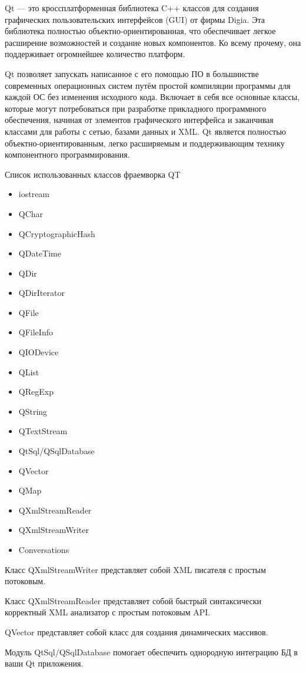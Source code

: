 Qt --- это кроссплатформенная библиотека C++ классов для создания графических пользовательских интерфейсов (GUI) от фирмы Digia. Эта библиотека полностью объектно-ориентированная, что обеспечивает легкое расширение возможностей и создание новых компонентов. Ко всему прочему, она поддерживает огромнейшее количество платформ.

Qt позволяет запускать написанное с его помощью ПО в большинстве современных операционных систем путём простой компиляции программы для каждой ОС без изменения исходного кода. Включает в себя все основные классы, которые могут потребоваться при разработке прикладного программного обеспечения, начиная от элементов графического интерфейса и заканчивая классами для работы с сетью, базами данных и XML. Qt является полностью объектно-ориентированным, легко расширяемым и поддерживающим технику компонентного программирования.

Список использованных классов фраемворка QT
\begin{itemize}
\item iostream
\item QChar
\item QCryptographicHash
\item QDateTime
\item QDir
\item QDirIterator
\item QFile
\item QFileInfo
\item QIODevice
\item QList
\item QRegExp
\item QString
\item QTextStream
\item QtSql/QSqlDatabase
\item QVector
\item QMap
\item QXmlStreamReader
\item QXmlStreamWriter
\item Conversations
\end{itemize}

Класс QXmlStreamWriter представляет собой XML писателя с простым потоковым.

Класс QXmlStreamReader представляет собой быстрый синтаксически корректный XML анализатор с простым потоковым API. 

QVector представляет собой класс для создания динамических массивов.

Модуль QtSql/QSqlDatabase помогает обеспечить однородную интеграцию БД в ваши Qt приложения.

